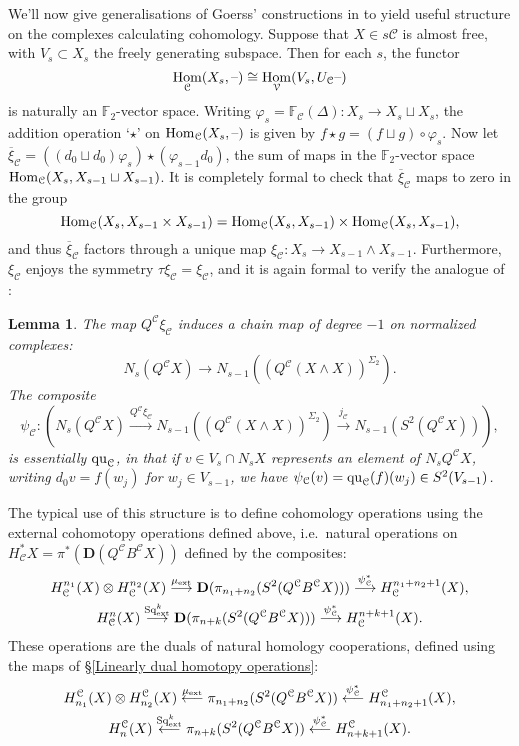 \documentclass[11pt]{amsart}
\theoremstyle{plain}
\newtheorem{lem}[thm]{Lemma}
\theoremstyle{definition}
\DeclareMathOperator{\Hom}{Hom}
\newcommand{\DASH}{\textup{--}}
\let\phi\varphi
\renewcommand{\to}{\longrightarrow}
\newcommand{\from}{\longleftarrow}
\newcommand{\calC}{\mathcal{C}}
\newcommand{\calV}{\mathcal{V}}
\theoremstyle{plain}
\newcommand{\quadratic}{\textup{qu}}
\newcommand{\ExtCohOp}{\textup{Sq}_\textup{ext}}
\newcommand{\ExtCohProd}{\mu_\textup{ext}}
\newcommand{\F}{\mathbb{F}}
\newcommand{\dual}{\mathbf{D}}
\begin{document}
\begin{Constructing (co)homotopy operations}
We'll now give generalisations of Goerss' constructions in \cite[\S5]{MR1089001} to yield useful structure on the complexes calculating cohomology.  Suppose that $X\in s\calC$ is almost free, with $V_s\subset X_s$ the freely generating subspace. Then for each $s$, the functor 
\[\Hom_\calC(X_s,\DASH)\cong \Hom_\calV(V_s,U_\calC\DASH)\]
is naturally an $\F_2$-vector space. Writing $\phi_s=\F_\calC(\Delta):X_s\to X_s\sqcup X_s$, the addition operation `$\star$' on $\Hom_\calC(X_s,\DASH)$ is given by $f\star g= (f\sqcup g)\circ\phi_s$. Now let
$\overline{\xi}_\calC=((d_0\sqcup d_0)\phi_s)\star(\phi_{s-1}d_0)$, the sum of maps in the $\F_2$-vector space $\textup{Hom}_\calC(X_s,X_{s-1}\sqcup X_{s-1})$. It is completely formal to check that $\overline{\xi}_\calC$ maps to zero in the group
\[\textup{Hom}_\calC(X_s,X_{s-1}\times X_{s-1})=\textup{Hom}_\calC(X_s,X_{s-1})\times \textup{Hom}_\calC(X_s,X_{s-1}),\]
and thus $\overline{\xi}_\calC$ factors through a unique map $\xi_\calC:X_s\to X_{s-1}\wedge X_{s-1}$. Furthermore, $\xi_\calC$ enjoys the symmetry $\tau\xi_\calC=\xi_\calC$, and it is again formal to verify the analogue of \cite[Lemma 5.5]{MR1089001}:
\begin{lem}\label{psi is basically the quadratic part}
The map $Q^\calC\xi_\calC$ induces a chain map of degree $-1$ on normalized complexes:
\[N_s(Q^{\calC}X)\to N_{s-1}((Q^{\calC}(X\wedge X))^{\Sigma_2}).\]
The composite
\[\psi_\calC:\left(N_s(Q^{\calC}X)\overset{Q^\calC\xi_\calC}{\to} N_{s-1}((Q^{\calC}(X\wedge X))^{\Sigma_2})\overset{j_\calC}{\to} N_{s-1}(S^2(Q^{\calC}X))\right),\]
is essentially $\quadratic_\calC$, in that if $v\in V_s\cap N_sX$ represents an element of $N_sQ^\calC X$, writing $d_0v=f(w_j)$ for $w_j\in V_{s-1}$, we have $\psi_\calC(v)=\quadratic_\calC(f)(w_j)\in S^2(V_{s-1})$.
\end{lem}
The typical use of this structure is to define cohomology operations using the external cohomotopy operations defined above, i.e.\ natural operations on $H^*_\calC X=\pi^*(\dual(Q^\calC B^\calC X))$ defined by the composites:
\begin{gather*}
H_\calC^{n_1}(X)\otimes H_\calC^{n_2}(X)\overset{\ExtCohProd}{\to} \dual(\pi_{n_1+n_2}(S^2(Q^\calC B^\calC X)))\overset{\psi_\calC^*}{\to} H_\calC^{n_1+n_2+1}(X),\\
H_\calC^{n}(X)\overset{\ExtCohOp^k}{\to} \dual(\pi_{n+k}(S^2(Q^\calC B^\calC X)))\overset{\psi_\calC^*}{\to} H_\calC^{n+k+1}(X).
\end{gather*}
These operations are the duals of natural homology cooperations, defined using the maps of \S\ref{Linearly dual homotopy operations}:
\begin{gather*}
H^\calC_{n_1}(X)\otimes H^\calC_{n_2}(X)\overset{\ExtCohProd}{\from} \pi_{n_1+n_2}(S^2(Q^\calC B^\calC X))\overset{\psi_\calC^*}{\from} H^\calC_{n_1+n_2+1}(X),\\
H^\calC_{n}(X)\overset{\ExtCohOp^k}{\from} \pi_{n+k}(S^2(Q^\calC B^\calC X))\overset{\psi_\calC^*}{\from} H^\calC_{n+k+1}(X).
\end{gather*}


\end{Constructing (co)homotopy operations}
\end{document}
